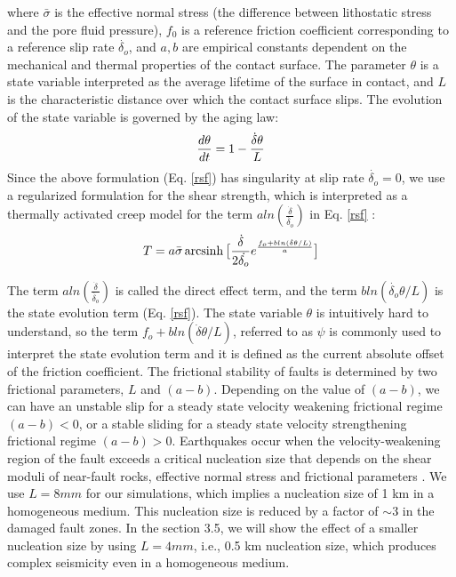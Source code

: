 \documentclass[11pt]{article}
\DeclareMathOperator{\arcsinh}{arcsinh}
\begin{document}
where $\bar{\sigma}$ is the effective normal stress (the difference between lithostatic stress and the pore fluid pressure), $f_0$ is a reference friction coefficient corresponding to a reference slip rate $\dot{\delta_o}$, and $a, b$ are empirical constants dependent on the mechanical and thermal properties of the contact surface. The parameter $\theta$ is a state variable interpreted as the average lifetime of the surface in contact, and $L$ is the characteristic distance over which the contact surface slips. The evolution of the state variable is governed by the aging law:
\begin{align}
    \centering
    \frac{d\theta}{dt} = 1 - \frac{\dot{\delta}\theta}{L}
    \label{rsf_evolution}
\end{align}
Since the above formulation (Eq. \ref{rsf}) has singularity at slip rate $\dot{\delta_o} =0$, we use a regularized formulation for the shear strength, which is interpreted as a thermally activated creep model for the term $aln(\frac{\dot{\delta}}{\dot{\delta_o}})$ in Eq. \ref{rsf} \citep{rice_benzion_1996, lapusta_2000}:
\begin{align}
    \centering
    T = a\bar{\sigma}\arcsinh\big[\frac{\dot{\delta}}{2\dot{\delta_o}}e^{\frac{f_o + bln(\dot{\delta}\theta/L)}{a}} \big]
\end{align}

The term $aln(\frac{\dot{\delta}}{\dot{\delta_o}})$ is called the direct effect term, and the term $bln(\dot{\delta_o} \theta/L)$ is the state evolution term (Eq. \ref{rsf}). The state variable $\theta$ is intuitively hard to understand, so the term $f_o+bln(\dot{\delta}\theta/L)$, referred to as $\psi$ is commonly used to interpret the state evolution term and it is defined as the current absolute offset of the friction coefficient. The frictional stability of faults is determined by two frictional parameters, $L$ and $(a-b)$. Depending on the value of $(a-b)$, we can have an unstable slip for a steady state velocity weakening frictional regime $(a-b)<0$, or a stable sliding for a steady state velocity strengthening frictional regime $(a-b)>0$. Earthquakes occur when the velocity-weakening region of the fault exceeds a critical nucleation size that depends on the shear moduli of near-fault rocks, effective normal stress and frictional parameters \citep{rice_1993, rubin_ampuero_2005}. We use $L = 8mm$ for our simulations, which implies a nucleation size of 1 km in a homogeneous medium. This nucleation size is reduced by a factor of $\sim 3$ in the damaged fault zones. In the section 3.5, we will show the effect of a smaller nucleation size by using $L = 4mm$, i.e., 0.5 km nucleation size, which produces complex seismicity even in a homogeneous medium. 
\end{document}
